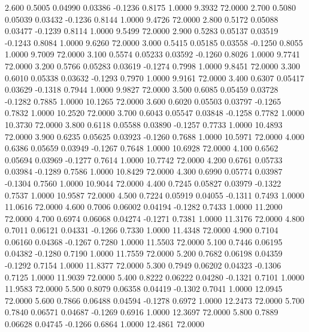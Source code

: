    2.600   0.5005   0.04990   0.03386  -0.1236   0.8175   1.0000   9.3932  72.0000
   2.700   0.5080   0.05039   0.03432  -0.1236   0.8144   1.0000   9.4726  72.0000
   2.800   0.5172   0.05088   0.03477  -0.1239   0.8114   1.0000   9.5499  72.0000
   2.900   0.5283   0.05137   0.03519  -0.1243   0.8084   1.0000   9.6260  72.0000
   3.000   0.5415   0.05185   0.03558  -0.1250   0.8055   1.0000   9.7009  72.0000
   3.100   0.5574   0.05233   0.03592  -0.1260   0.8026   1.0000   9.7741  72.0000
   3.200   0.5766   0.05283   0.03619  -0.1274   0.7998   1.0000   9.8451  72.0000
   3.300   0.6010   0.05338   0.03632  -0.1293   0.7970   1.0000   9.9161  72.0000
   3.400   0.6307   0.05417   0.03629  -0.1318   0.7944   1.0000   9.9827  72.0000
   3.500   0.6085   0.05459   0.03728  -0.1282   0.7885   1.0000  10.1265  72.0000
   3.600   0.6020   0.05503   0.03797  -0.1265   0.7832   1.0000  10.2520  72.0000
   3.700   0.6043   0.05547   0.03848  -0.1258   0.7782   1.0000  10.3730  72.0000
   3.800   0.6118   0.05588   0.03890  -0.1257   0.7733   1.0000  10.4893  72.0000
   3.900   0.6235   0.05625   0.03923  -0.1260   0.7688   1.0000  10.5971  72.0000
   4.000   0.6386   0.05659   0.03949  -0.1267   0.7648   1.0000  10.6928  72.0000
   4.100   0.6562   0.05694   0.03969  -0.1277   0.7614   1.0000  10.7742  72.0000
   4.200   0.6761   0.05733   0.03984  -0.1289   0.7586   1.0000  10.8429  72.0000
   4.300   0.6990   0.05774   0.03987  -0.1304   0.7560   1.0000  10.9044  72.0000
   4.400   0.7245   0.05827   0.03979  -0.1322   0.7537   1.0000  10.9587  72.0000
   4.500   0.7224   0.05919   0.04055  -0.1311   0.7493   1.0000  11.0616  72.0000
   4.600   0.7006   0.06002   0.04194  -0.1282   0.7433   1.0000  11.2000  72.0000
   4.700   0.6974   0.06068   0.04274  -0.1271   0.7381   1.0000  11.3176  72.0000
   4.800   0.7011   0.06121   0.04331  -0.1266   0.7330   1.0000  11.4348  72.0000
   4.900   0.7104   0.06160   0.04368  -0.1267   0.7280   1.0000  11.5503  72.0000
   5.100   0.7446   0.06195   0.04382  -0.1280   0.7190   1.0000  11.7559  72.0000
   5.200   0.7682   0.06198   0.04359  -0.1292   0.7154   1.0000  11.8377  72.0000
   5.300   0.7949   0.06202   0.04323  -0.1306   0.7125   1.0000  11.9039  72.0000
   5.400   0.8222   0.06222   0.04280  -0.1321   0.7101   1.0000  11.9583  72.0000
   5.500   0.8079   0.06358   0.04419  -0.1302   0.7041   1.0000  12.0945  72.0000
   5.600   0.7866   0.06488   0.04594  -0.1278   0.6972   1.0000  12.2473  72.0000
   5.700   0.7840   0.06571   0.04687  -0.1269   0.6916   1.0000  12.3697  72.0000
   5.800   0.7889   0.06628   0.04745  -0.1266   0.6864   1.0000  12.4861  72.0000
